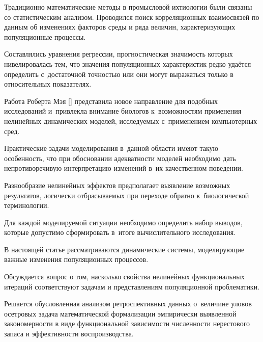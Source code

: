 







Традиционно математические методы в промысловой ихтиологии были связаны со статистическим анализом. Проводился поиск корреляционных взаимосвязей по данным об изменениях факторов среды и ряда величин, характеризующих популяционные процессы. 

Составлялись уравнения регрессии, прогностическая значимость которых нивелировалась тем, что значения популяционных характеристик редко удаётся определить с~достаточной точностью или они могут выражаться только в относительных показателях. 

Работа Роберта Мэя [] представила новое направление для подобных исследований и~привлекла внимание биологов к~возможностям применения нелинейных динамических моделей, исследуемых с~применением компьютерных сред.



Практические задачи моделирования в~данной области имеют такую особенность, что при обосновании адекватности моделей необходимо дать непротиворечивую интерпретацию изменений в~их качественном поведении.

Разнообразие нелинейных эффектов предполагает выявление возможных результатов, логически отбрасываемых при переходе обратно к~биологической терминологии. 

Для каждой моделируемой ситуации необходимо определить набор выводов, которые допустимо сформировать в~итоге вычислительного исследования.



В настоящей статье рассматриваются динамические системы, моделирующие важные изменения популяционных процессов. 

Обсуждается вопрос о том, насколько свойства нелинейных функциональных итераций соответствуют задачам и представлениям популяционной проблематики. 

Решается обусловленная анализом ретроспективных данных о~величине уловов осетровых задача  математической формализации эмпирически выявленной закономерности в виде функциональной зависимости численности нерестового запаса и эффективности воспроизводства. 

